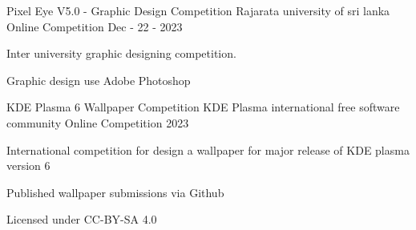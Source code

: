 

\begin{cventries}

  \cventry
    {Pixel Eye V5.0 - Graphic Design Competition} %
    {Rajarata university of sri lanka} %
    {Online Competition} %
    {Dec - 22 - 2023} %
    {
      \begin{cvitems} %
        \item {Inter university graphic designing competition.}
        \item {Graphic design use Adobe Photoshop}
      \end{cvitems}
    }

  \cventry
    {KDE Plasma 6 Wallpaper Competition} %
    {KDE Plasma international free software community} %
    {Online Competition} %
    {2023} %
    {
      \begin{cvitems} %
        \item {International competition for design a wallpaper for major release of KDE plasma version 6}
        \item {Published wallpaper submissions via Github}
        \item {Licensed under CC-BY-SA 4.0}
      \end{cvitems}
    }

\end{cventries}

